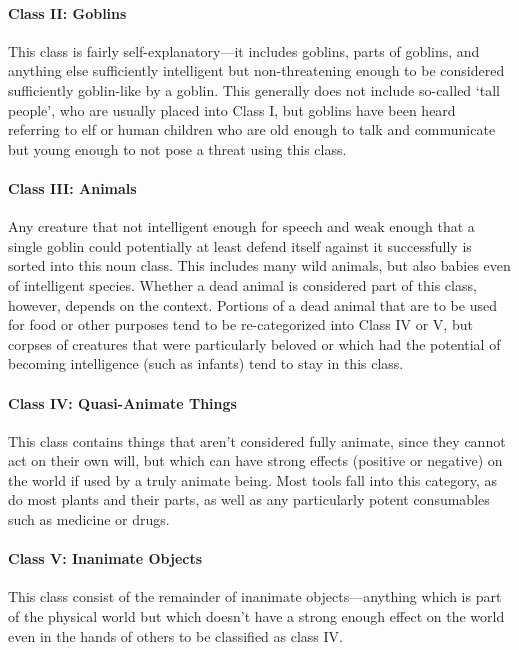 \documentclass[a4paper,11pt,oneside,openany]{memoir}
\begin{document}
\paragraph{Class II: Goblins}

This class is fairly self-explanatory---it includes goblins, parts of goblins, and anything else sufficiently intelligent but non-threatening enough to be considered sufficiently goblin-like by a goblin. This generally does not include so-called `tall people', who are usually placed into Class I, but goblins have been heard referring to elf or human children who are old enough to talk and communicate but young enough to not pose a threat using this class.

\paragraph{Class III: Animals}

Any creature that not intelligent enough for speech and weak enough that a single goblin could potentially at least defend itself against it successfully is sorted into this noun class. This includes many wild animals, but also babies even of intelligent species. Whether a dead animal is considered part of this class, however, depends on the context. Portions of a dead animal that are to be used for food or other purposes tend to be re-categorized into Class IV or V, but corpses of creatures that were particularly beloved or which had the potential of becoming intelligence (such as infants) tend to stay in this class.

\paragraph{Class IV: Quasi-Animate Things}

This class contains things that aren't considered fully animate, since they cannot act on their own will, but which can have strong effects (positive or negative) on the world if used by a truly animate being. Most tools fall into this category, as do most plants and their parts, as well as any particularly potent consumables such as medicine or drugs. 

\paragraph{Class V: Inanimate Objects}

This class consist of the remainder of inanimate objects---anything which is part of the physical world but which doesn't have a strong enough effect on the world even in the hands of others to be classified as class IV. 
\end{document}
